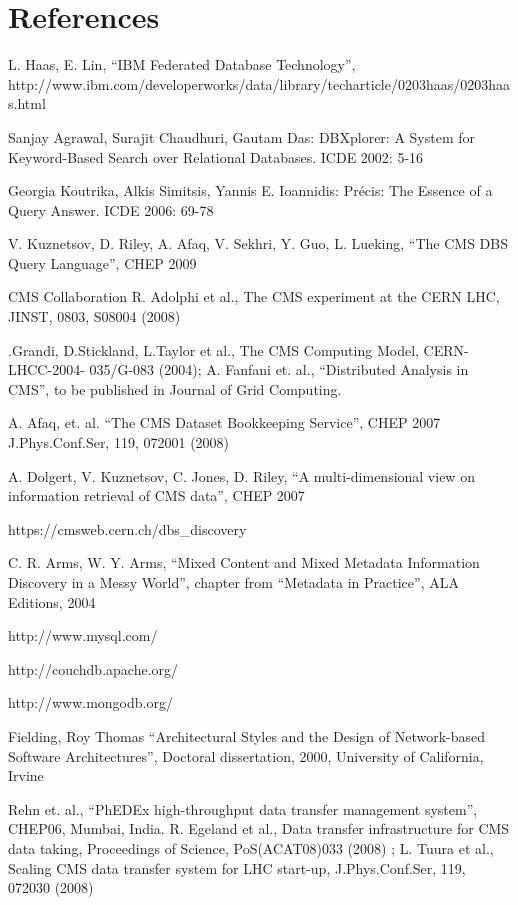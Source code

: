 \documentclass[a4paper]{jpconf}
\begin{document}
\section*{References}
\begin{thebibliography}{9}
L. Haas, E. Lin,
``IBM Federated Database Technology'', \\
http://www.ibm.com/developerworks/data/library/techarticle/0203haas/0203haas.html

Sanjay Agrawal, Surajit Chaudhuri, Gautam Das: DBXplorer: A System for
Keyword-Based Search over Relational Databases. ICDE 2002: 5-16

Georgia Koutrika, Alkis Simitsis, Yannis E. Ioannidis: Pr\'{e}cis: The Essence of
a Query Answer. ICDE 2006: 69-78

 V. Kuznetsov, D. Riley, A. Afaq, V. Sekhri, Y. Guo, L. Lueking,
``The CMS DBS Query Language'', CHEP 2009

 CMS Collaboration R. Adolphi et al., The CMS experiment at the CERN LHC, JINST, 0803, S08004 (2008)

.Grandi, D.Stickland, L.Taylor et al., The CMS Computing Model, CERN-LHCC-2004- 035/G-083 (2004);
A. Fanfani et. al.,
``Distributed Analysis in CMS'', to be published in Journal of Grid Computing.

 A. Afaq, et. al. ``The CMS Dataset Bookkeeping Service'', CHEP 2007 
J.Phys.Conf.Ser, 119, 072001 (2008)

 A. Dolgert, V. Kuznetsov, C. Jones, D. Riley, 
``A multi-dimensional view on information retrieval of CMS data'', CHEP 2007

 https://cmsweb.cern.ch/dbs\_discovery

C. R. Arms, W. Y. Arms, ``Mixed Content and Mixed Metadata 
Information Discovery in a Messy World'',
chapter from ``Metadata in Practice'', ALA Editions, 2004

http://www.mysql.com/

http://couchdb.apache.org/

http://www.mongodb.org/

Fielding, Roy Thomas ``Architectural Styles and the Design of 
Network-based Software Architectures'', Doctoral dissertation, 2000,
University of California, Irvine

Rehn et. al.,
``PhEDEx high-throughput data transfer management system'', CHEP06, Mumbai, India.
R. Egeland et al., Data transfer infrastructure for CMS data taking, Proceedings of Science,
PoS(ACAT08)033 (2008) ;
L. Tuura et al., Scaling CMS data transfer system for LHC start-up, J.Phys.Conf.Ser, 119, 072030 (2008)


\end{thebibliography}
\end{document}
